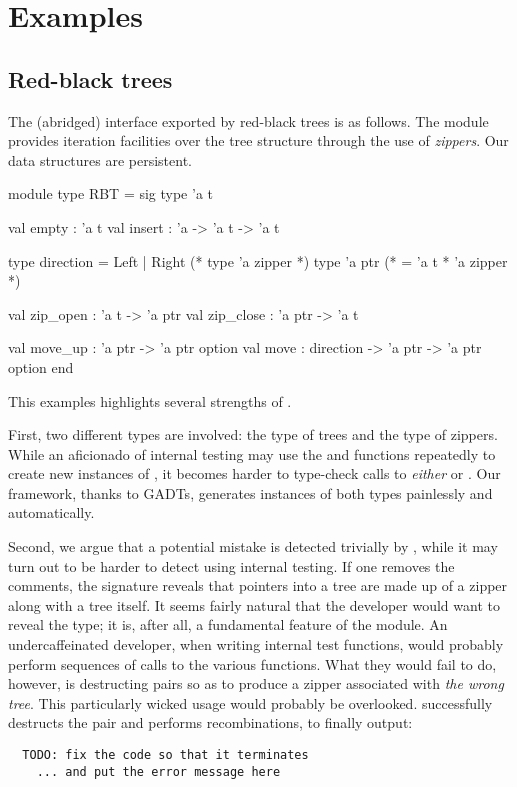 \section{Examples}

\subsection{Red-black trees}
The (abridged) interface exported by red-black trees is as follows. The module
provides iteration facilities over the tree structure through the use of
\cite{huet-zipper-97}
\emph{zippers}. Our data structures are persistent.
%
\begin{ocamlcode}
module type RBT = sig
  type 'a t

  val empty : 'a t
  val insert : 'a -> 'a t -> 'a t

  type direction = Left | Right
  (* type 'a zipper *)
  type 'a ptr (* = 'a t * 'a zipper *)

  val zip_open : 'a t -> 'a ptr
  val zip_close : 'a ptr -> 'a t

  val move_up : 'a ptr -> 'a ptr option
  val move : direction -> 'a ptr -> 'a ptr option
end
\end{ocamlcode}
%
This examples highlights several strengths of \arti.

First, two different types are involved: the type of trees and the type of
zippers. While an aficionado of internal testing may use the  and
 functions repeatedly to create new instances of , it
becomes harder to type-check calls to \emph{either}  or
. Our framework, thanks to GADTs, generates instances of both
types painlessly and automatically.

Second, we argue that a potential mistake is detected trivially by \arti, while
it may turn out to be harder to detect using internal testing. If one removes
the comments, the signature reveals that pointers into a tree are made up of a
zipper along with a tree itself. It seems fairly natural that the developer
would want to reveal the  type; it is, after all, a fundamental
feature of the module. An undercaffeinated developer, when writing internal test
functions, would probably perform sequences of calls to the various functions.
What they would fail to do, however, is destructing pairs so as to produce
a zipper associated with \emph{the wrong tree}. This particularly wicked usage
would probably be overlooked. \arti successfully destructs the pair and performs
recombinations, to finally output:
\begin{verbatim}
  TODO: fix the code so that it terminates
    ... and put the error message here
\end{verbatim}

